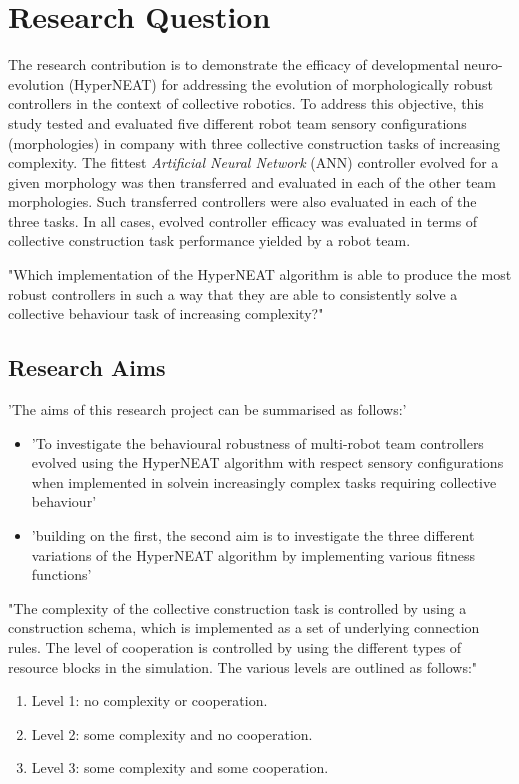 \section{Research Question}

The research contribution is to demonstrate the efficacy of developmental neuro-evolution (HyperNEAT) for
addressing the evolution of morphologically robust controllers in the context of collective robotics.
To address this objective, this study tested and evaluated five different robot team sensory configurations
(morphologies) in company with three collective construction tasks of increasing complexity.  The fittest
\textit{Artificial Neural Network} (ANN) controller evolved for a given morphology was then transferred and
evaluated in each of the other team morphologies. Such transferred controllers were also evaluated in
each of the three tasks.  In all cases, evolved controller efficacy was evaluated in terms of
collective construction task performance yielded by a robot team.

"Which implementation of the HyperNEAT algorithm is able to produce the most robust controllers in such a way that they are able to consistently solve a collective behaviour task of increasing complexity?"

\subsection{Research Aims}

'The aims of this research project can be summarised as follows:'
\begin{itemize}
	\item 'To investigate the behavioural robustness of multi-robot team controllers evolved using the HyperNEAT algorithm with respect sensory configurations when implemented in solvein increasingly complex tasks requiring collective behaviour'
	\item 'building on the first, the second aim is to investigate the three different variations of the HyperNEAT algorithm by implementing various fitness functions'
\end{itemize}

"The complexity of the collective construction task is controlled by using a construction schema, which is implemented as a set of underlying connection rules. The level of cooperation is controlled by using the different types of resource blocks in the simulation.
The various levels are outlined as follows:"
\begin{enumerate}
	\item Level 1: no complexity or cooperation.
	\item Level 2: some complexity and no cooperation.
	\item Level 3: some complexity and some cooperation.
\end{enumerate}





